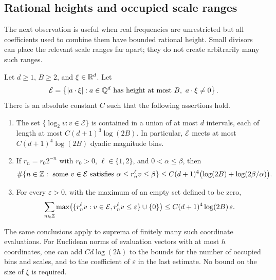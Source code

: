 \subsection{Rational heights and occupied scale ranges}

The next observation is useful when real frequencies are unrestricted but
all coefficients used to combine them have bounded rational height.  Small
divisors can place the relevant scale ranges far apart; they do not create
arbitrarily many such ranges.

\begin{lemma}
\label{lem:height-bins}
Let $d\ge1$, $B\ge2$, and $\xi\in\mathbb R^d$.  Let
\[
 \mathcal E=\left\{|a\cdot\xi|:
       a\in\Q^d\text{ has height at most }B,\ a\cdot\xi\ne0\right\}.
\]
There is an absolute constant $C$ such that the following assertions hold.
\begin{enumerate}
\item The set $\{\log_2v:v\in\mathcal E\}$ is contained in a union of at
most $d$ intervals, each of length at most
$C(d+1)^3\log(2B)$.  In particular, $\mathcal E$ meets at most
$C(d+1)^4\log(2B)$ dyadic magnitude bins.
\item If $r_n=r_0 2^{-n}$ with $r_0>0$, $\ell\in\{1,2\}$, and
$0<\alpha\le\beta$, then
\[
 \#\{n\in\mathbb Z:\text{ some }v\in\mathcal E
                  \text{ satisfies }\alpha\le r_n^\ell v\le\beta\}
 \le C(d+1)^4\bigl(\log(2B)+\log(2\beta/\alpha)\bigr).
\]
\item For every $\varepsilon>0$, with the maximum of an empty set defined
to be zero,
\[
 \sum_{n\in\mathbb Z}
     \max\bigl(\{r_n^\ell v:v\in\mathcal E,
                       r_n^\ell v\le\varepsilon\}\cup\{0\}\bigr)
     \le C(d+1)^4\log(2B)\,\varepsilon.
\]
\end{enumerate}
The same conclusions apply to suprema of finitely many such coordinate
evaluations.  For Euclidean norms of evaluation vectors with at most $h$
coordinates, one can add $C d\log(2h)$ to the bounds for the number of
occupied bins and scales, and to the coefficient of $\varepsilon$ in the
last estimate.  No bound on the size of $\xi$ is required.
\end{lemma}

